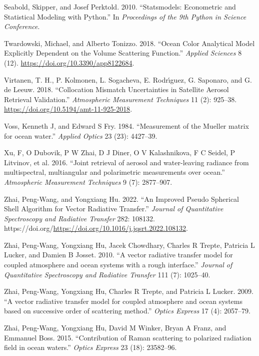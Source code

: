 \documentclass[
  letterpaper,
  open=any]{scrbook}
\newlength{\cslhangindent}
\newenvironment{CSLReferences}[2] %
 {\begin{list}{}{%
  \setlength{\itemindent}{0pt}
  \setlength{\leftmargin}{0pt}
  \setlength{\parsep}{0pt}
  \ifodd #1
   \setlength{\leftmargin}{\cslhangindent}
   \setlength{\itemindent}{-1\cslhangindent}
  \fi
  \setlength{\itemsep}{#2\baselineskip}}}
 {\end{list}}
\begin{document}
\begin{CSLReferences}{1}{0}
Seabold, Skipper, and Josef Perktold. 2010. {``Statsmodels: Econometric
and Statistical Modeling with Python.''} In \emph{Proceedings of the 9th
Python in Science Conference}.

Twardowski, Michael, and Alberto Tonizzo. 2018. {``Ocean Color
Analytical Model Explicitly Dependent on the Volume Scattering
Function.''} \emph{Applied Sciences} 8 (12).
\url{https://doi.org/10.3390/app8122684}.

Virtanen, T. H., P. Kolmonen, L. Sogacheva, E. Rodrı́guez, G. Saponaro,
and G. de Leeuw. 2018. {``Collocation Mismatch Uncertainties in
Satellite Aerosol Retrieval Validation.''} \emph{Atmospheric Measurement
Techniques} 11 (2): 925--38.
\url{https://doi.org/10.5194/amt-11-925-2018}.

Voss, Kenneth J, and Edward S Fry. 1984. {``{Measurement of the Mueller
matrix for ocean water}.''} \emph{Applied Optics} 23 (23): 4427--39.

Xu, F, O Dubovik, P W Zhai, D J Diner, O V Kalashnikova, F C Seidel, P
Litvinov, et al. 2016. {``{Joint retrieval of aerosol and water-leaving
radiance from multispectral, multiangular and polarimetric measurements
over ocean}.''} \emph{Atmospheric Measurement Techniques} 9 (7):
2877--907.

Zhai, Peng-Wang, and Yongxiang Hu. 2022. {``An Improved Pseudo Spherical
Shell Algorithm for Vector Radiative Transfer.''} \emph{Journal of
Quantitative Spectroscopy and Radiative Transfer} 282: 108132.
https://doi.org/\url{https://doi.org/10.1016/j.jqsrt.2022.108132}.

Zhai, Peng-Wang, Yongxiang Hu, Jacek Chowdhary, Charles R Trepte,
Patricia L Lucker, and Damien B Josset. 2010. {``{A vector radiative
transfer model for coupled atmosphere and ocean systems with a rough
interface}.''} \emph{Journal of Quantitative Spectroscopy and Radiative
Transfer} 111 (7): 1025--40.

Zhai, Peng-Wang, Yongxiang Hu, Charles R Trepte, and Patricia L Lucker.
2009. {``{A vector radiative transfer model for coupled atmosphere and
ocean systems based on successive order of scattering method}.''}
\emph{Optics Express} 17 (4): 2057--79.

Zhai, Peng-Wang, Yongxiang Hu, David M Winker, Bryan A Franz, and
Emmanuel Boss. 2015. {``{Contribution of Raman scattering to polarized
radiation field in ocean waters}.''} \emph{Optics Express} 23 (18):
23582--96.


\end{CSLReferences}
\end{document}

